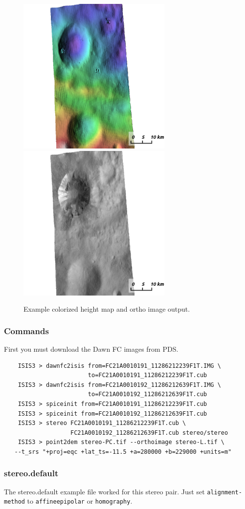 \begin{figure}[h!]
\centering
  \includegraphics[width=3.0in]{images/examples/dawn/VestaDEMRender.png}
  \includegraphics[width=3.0in]{images/examples/dawn/VestaDRGRender.png}
\caption{Example colorized height map and ortho image output.}
\label{fig:dawn-nomap-example}
\end{figure}

\subsubsection*{Commands}

First you must download the Dawn FC images from PDS.

\begin{verbatim}
    ISIS3 > dawnfc2isis from=FC21A0010191_11286212239F1T.IMG \
                        to=FC21A0010191_11286212239F1T.cub
    ISIS3 > dawnfc2isis from=FC21A0010192_11286212639F1T.IMG \
                        to=FC21A0010192_11286212639F1T.cub
    ISIS3 > spiceinit from=FC21A0010191_11286212239F1T.cub
    ISIS3 > spiceinit from=FC21A0010192_11286212639F1T.cub
    ISIS3 > stereo FC21A0010191_11286212239F1T.cub \
                   FC21A0010192_11286212639F1T.cub stereo/stereo
    ISIS3 > point2dem stereo-PC.tif --orthoimage stereo-L.tif \
   --t_srs "+proj=eqc +lat_ts=-11.5 +a=280000 +b=229000 +units=m"
\end{verbatim}

\subsubsection*{stereo.default}

The stereo.default example file worked for this stereo pair. Just set
\texttt{alignment-method} to \texttt{affineepipolar} or
\texttt{homography}.
